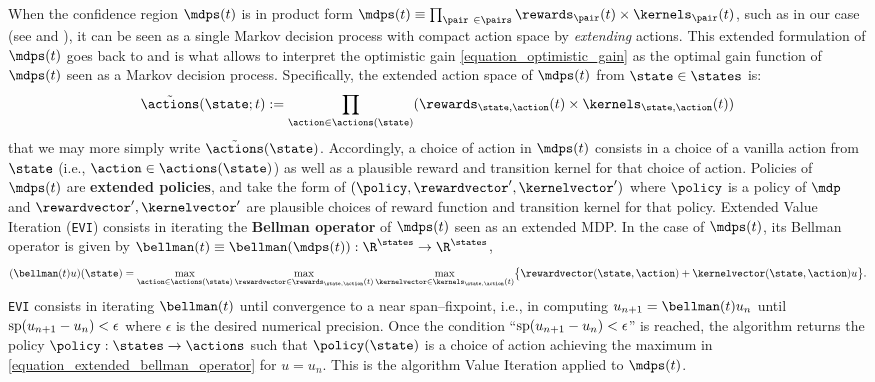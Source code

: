 \documentclass[preprint,cleveref,12pt]{colt2025}
\DeclarePairedDelimiter{\braces}{\{}{\}}	%
\DeclarePairedDelimiter{\parens}{(}{)}	%
\def\product{\prod}
\newcommand{\vecspan}[1]{\mathrm{sp}\parens{#1}}
\def\model{\mdp}
\def\models{\mdps}
\def\kernel{\kernelvector}
\def\reward{\rewardvector}
\newcommand{\strong}[1]{\textbf{#1}}
\begin{document}
    When the confidence region $\models(t)$ is in product form $\models(t) \equiv \product_{\pair \in \pairs} \rewards_\pair(t) \times \kernels_\pair (t)$, such as in our case (see  and ), it can be seen as a single Markov decision process with compact action space by \emph{extending} actions.
    This extended formulation of $\models(t)$ goes back to \cite{auer_near_optimal_2009} and is what allows to interpret the optimistic gain \eqref{equation_optimistic_gain} as the optimal gain function of $\models(t)$ seen as a Markov decision process.
    Specifically, the extended action space of $\models(t)$ from $\state \in \states$ is:
    \begin{equation*}
        \tilde{\actions}(\state; t) 
        :=
        \product_{\action \in \actions(\state)}
        \parens*{
            \rewards_{\state, \action}(t) \times \kernels_{\state, \action}(t)
        }
    \end{equation*}
    that we may more simply write $\tilde{\actions}(\state)$.
    Accordingly, a choice of action in $\models(t)$ consists in a choice of a vanilla action from $\state$ (i.e., $\action \in \actions(\state)$) as well as a plausible reward and transition kernel for that choice of action. 
    Policies of $\models(t)$ are \strong{extended policies}, and take the form of $(\policy, \reward', \kernel')$ where $\policy$ is a policy of $\model$ and $\reward', \kernel'$ are plausible choices of reward function and transition kernel for that policy. 
    Extended Value Iteration (\texttt{EVI}) consists in iterating the \strong{Bellman operator} \cite[§8.5]{puterman_markov_1994} of $\models(t)$ seen as an extended MDP.
    In the case of $\models(t)$, its Bellman operator is given by $\mathcal{\bellman}(t) \equiv \bellman(\models(t)): \R^\states \to \R^\states$, 
    \begin{equation}
    \label{equation_extended_bellman_operator}
        \parens*{\mathcal{\bellman}(t) u}(\state)
        =
        \max_{\action \in \actions(\state)}
        \max_{\reward \in \rewards_{\state, \action}(t)}
        \max_{\kernel \in \kernels_{\state, \action}(t)}
        \braces[\big]{
            \reward(\state, \action) 
            + 
            \kernel(\state, \action) u
        }
        .
    \end{equation}
    \texttt{EVI} consists in iterating $\mathcal{\bellman}(t)$ until convergence to a near span--fixpoint, i.e., in computing $u_{n+1} = \mathcal{\bellman}(t) u_n$ until $\vecspan{u_{n+1} - u_n} < \epsilon$ where $\epsilon$ is the desired numerical precision. 
    Once the condition ``$\vecspan{u_{n+1} - u_n} < \epsilon$'' is reached, the algorithm returns the policy $\policy : \states \to \actions$ such that $\policy(\state)$ is a choice of action achieving the maximum in \eqref{equation_extended_bellman_operator} for $u = u_n$. 
    This is the algorithm Value Iteration \cite[§8.5]{puterman_markov_1994} applied to $\models(t)$. 
\end{document}
